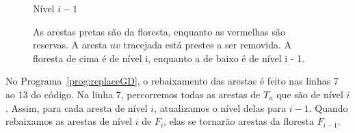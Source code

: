 \begin{figure}
\begin{minipage}[c]{0.8\textwidth}
\begin{tikzpicture}
        \end{tikzpicture}
    \end{minipage}
    \vspace{1cm}
        \noindent
    \begin{minipage}[c]{2cm}
        \raggedright
        Nível $i - 1$
    \end{minipage}%
    \begin{minipage}[c]{0.8\textwidth}
        \centering
    \end{minipage}
    \caption{As arestas pretas são da floresta, enquanto as vermelhas são reservas. A aresta $uv$ tracejada está prestes a ser removida. A floresta de cima é de nível i, enquanto a de baixo é de nível i - 1.}
    \vspace{-1cm}
    \label{fig:example-removal-part1}
\end{figure}

No Programa~\ref{prog:replaceGD}, o rebaixamento das arestas é feito nas linhas $7$ ao $13$ do código. Na linha $7$, percorremos todas as arestas de $T_u$ que são de nível $i$. Assim, para cada aresta de nível $i$, atualizamos o nível delas para $i - 1$. Quando rebaixamos as arestas de nível $i$ de $F_i$, elas se tornarão arestas da floresta $F_{i-1}$. 

